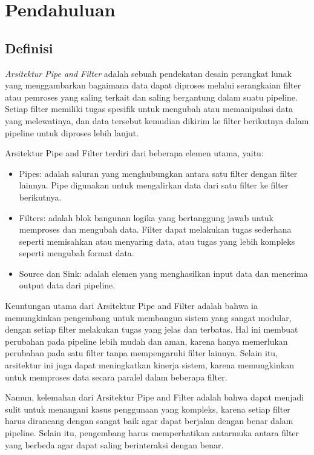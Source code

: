 \chapter{Pendahuluan}



	\section{Definisi}
		\textit{Arsitektur Pipe and Filter} adalah sebuah pendekatan desain perangkat lunak yang menggambarkan bagaimana data dapat diproses melalui serangkaian filter atau pemroses yang saling terkait dan saling bergantung dalam suatu pipeline. Setiap filter memiliki tugas spesifik untuk mengubah atau memanipulasi data yang melewatinya, dan data tersebut kemudian dikirim ke filter berikutnya dalam pipeline untuk diproses lebih lanjut.
	
	Arsitektur Pipe and Filter terdiri dari beberapa elemen utama, yaitu:
	\begin{itemize}
		\item Pipes: adalah saluran yang menghubungkan antara satu filter dengan filter lainnya. Pipe digunakan untuk mengalirkan data dari satu filter ke filter berikutnya.
		\item Filters: adalah blok bangunan logika yang bertanggung jawab untuk memproses dan mengubah data. Filter dapat melakukan tugas sederhana seperti memisahkan atau menyaring data, atau tugas yang lebih kompleks seperti mengubah format data.
		\item Source dan Sink: adalah elemen yang menghasilkan input data dan menerima output data dari pipeline.
	\end{itemize}
	
	Keuntungan utama dari Arsitektur Pipe and Filter adalah bahwa ia memungkinkan pengembang untuk membangun sistem yang sangat modular, dengan setiap filter melakukan tugas yang jelas dan terbatas. Hal ini membuat perubahan pada pipeline lebih mudah dan aman, karena hanya memerlukan perubahan pada satu filter tanpa mempengaruhi filter lainnya. Selain itu, arsitektur ini juga dapat meningkatkan kinerja sistem, karena memungkinkan untuk memproses data secara paralel dalam beberapa filter.
	
	Namun, kelemahan dari Arsitektur Pipe and Filter adalah bahwa dapat menjadi sulit untuk menangani kasus penggunaan yang kompleks, karena setiap filter harus dirancang dengan sangat baik agar dapat berjalan dengan benar dalam pipeline. Selain itu, pengembang harus memperhatikan antarmuka antara filter yang berbeda agar dapat saling berinteraksi dengan benar.
	
